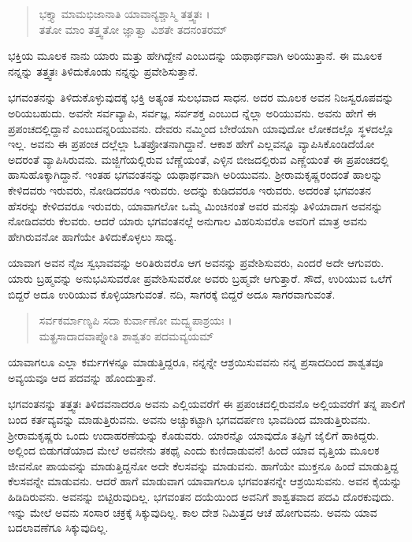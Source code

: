 \begin{verse}
ಭಕ್ತ್ಯಾ ಮಾಮಭಿಜಾನಾತಿ ಯಾವಾನ್ಯಶ್ಚಾಸ್ಮಿ ತತ್ತ್ವತಃ ।\\ತತೋ ಮಾಂ ತತ್ತ್ವತೋ ಜ್ಞಾತ್ವಾ ವಿಶತೇ ತದನಂತರಮ್ 
\end{verse}

{\small ಭಕ್ತಿಯ ಮೂಲಕ ನಾನು ಯಾರು ಮತ್ತು ಹೇಗಿದ್ದೇನೆ ಎಂಬುದನ್ನು ಯಥಾರ್ಥವಾಗಿ ಅರಿಯುತ್ತಾನೆ. ಈ ಮೂಲಕ ನನ್ನನ್ನು ತತ್ತ್ವತಃ ತಿಳಿದುಕೊಂಡು ನನ್ನನ್ನು ಪ್ರವೇಶಿಸುತ್ತಾನೆ.}

ಭಗವಂತನನ್ನು ತಿಳಿದುಕೊಳ್ಳುವುದಕ್ಕೆ ಭಕ್ತಿ ಅತ್ಯಂತ ಸುಲಭವಾದ ಸಾಧನ. ಅದರ ಮೂಲಕ ಅವನ ನಿಜಸ್ವರೂಪವನ್ನು ಅರಿಯಬಹುದು. ಅವನೇ ಸರ್ವವ್ಯಾಪಿ, ಸರ್ವಜ್ಞ, ಸರ್ವಶಕ್ತ ಎಂಬುದ ನ್ನೆಲ್ಲಾ ಅರಿಯುವನು. ಅವನು ಹೇಗೆ ಈ ಪ್ರಪಂಚದಲ್ಲಿದ್ದಾನೆ ಎಂಬುದನ್ನರಿಯುವನು. ದೇವರು ನಮ್ಮಿಂದ ಬೇರೆಯಾಗಿ ಯಾವುದೋ ಲೋಕದಲ್ಲೊ ಸ್ಥಳದಲ್ಲೊ ಇಲ್ಲ. ಅವನು ಈ ಪ್ರಪಂಚ ದಲ್ಲೆಲ್ಲಾ ಓತಪ್ರೋತನಾಗಿದ್ದಾನೆ. ಆಕಾಶ ಹೇಗೆ ಎಲ್ಲವನ್ನೂ ವ್ಯಾಪಿಸಿಕೊಂಡಿದೆಯೋ ಅದರಂತೆ ವ್ಯಾಪಿಸಿರುವನು. ಮಜ್ಜಿಗೆಯಲ್ಲಿರುವ ಬೆಣ್ಣೆಯಂತೆ, ಎಳ್ಳಿನ ಬೀಜದಲ್ಲಿರುವ ಎಣ್ಣೆಯಂತೆ ಈ ಪ್ರಪಂಚದಲ್ಲಿ ಹಾಸುಹೊಕ್ಕಾಗಿದ್ದಾನೆ. ಇಂತಹ ಭಗವಂತನನ್ನು ಯಥಾರ್ಥವಾಗಿ ಅರಿಯುವನು. ಶ್ರೀರಾಮಕೃಷ್ಣರಂದಂತೆ ಹಾಲನ್ನು ಕೇಳಿದವರು ಇರುವರು, ನೋಡಿದವರೂ ಇರುವರು. ಅದನ್ನು ಕುಡಿದವರೂ ಇರುವರು. ಅದರಂತೆ ಭಗವಂತನ ಹೆಸರನ್ನು ಕೇಳಿದವರೂ ಇರುವರು, ಯಾವಾಗಲೋ ಒಮ್ಮೆ ಮಿಂಚಿನಂತೆ ಅವರ ಮನಸ್ಸು ತಿಳಿಯಾದಾಗ ಅವನನ್ನು ನೋಡಿದವರು ಕೆಲವರು. ಆದರೆ ಯಾರು ಭಗವಂತನಲ್ಲೆ ಅನುಗಾಲ ವಿಹರಿಸುವರೊ ಅವರಿಗೆ ಮಾತ್ರ ಅವನು ಹೇಗಿರುವನೋ ಹಾಗೆಯೇ ತಿಳಿದುಕೊಳ್ಳಲು ಸಾಧ್ಯ.

ಯಾವಾಗ ಅವನ ನೈಜ ಸ್ವಭಾವವನ್ನು ಅರಿತಿರುವರೊ ಆಗ ಅವನನ್ನು ಪ್ರವೇಶಿಸುವರು, ಎಂದರೆ ಅದೇ ಆಗುವರು. ಯಾರು ಬ್ರಹ್ಮವನ್ನು ಅನುಭವಿಸುವರೋ ಪ್ರವೇಶಿಸುವರೋ ಅವರು ಬ್ರಹ್ಮವೇ ಆಗುತ್ತಾರೆ. ಸೌದೆ, ಉರಿಯುವ ಒಲೆಗೆ ಬಿದ್ದರೆ ಅದೂ ಉರಿಯುವ ಕೊಳ್ಳಿಯಾಗುವಂತೆ. ನದಿ, ಸಾಗರಕ್ಕೆ ಬಿದ್ದರೆ ಅದೂ ಸಾಗರವಾಗುವಂತೆ.

\begin{verse}
ಸರ್ವಕರ್ಮಾಣ್ಯಪಿ ಸದಾ ಕುರ್ವಾಣೋ ಮದ್ವ್ಯಪಾಶ್ರಯಃ ।\\ಮತ್ಪ್ರಸಾದಾದವಾಪ್ನೋತಿ ಶಾಶ್ವತಂ ಪದಮವ್ಯಯಮ್ 
\end{verse}

{\small ಯಾವಾಗಲೂ ಎಲ್ಲಾ ಕರ್ಮಗಳನ್ನೂ ಮಾಡುತ್ತಿದ್ದರೂ, ನನ್ನನ್ನೇ ಆಶ್ರಯಿಸುವವನು ನನ್ನ ಪ್ರಸಾದದಿಂದ ಶಾಶ್ವತವೂ ಅವ್ಯಯವೂ ಆದ ಪದವನ್ನು ಹೊಂದುತ್ತಾನೆ.}

ಭಗವಂತನನ್ನು ತತ್ತ್ವತಃ ತಿಳಿದವನಾದರೂ ಅವನು ಎಲ್ಲಿಯವರೆಗೆ ಈ ಪ್ರಪಂಚದಲ್ಲಿರುವನೊ ಅಲ್ಲಿಯವರೆಗೆ ತನ್ನ ಪಾಲಿಗೆ ಬಂದ ಕರ್ತವ್ಯವನ್ನು ಮಾಡುತ್ತಿರುವನು. ಅವನು ಅಚ್ಚುಕಟ್ಟಾಗಿ ಭಗವದರ್ಪಣ ಭಾವದಿಂದ ಮಾಡುತ್ತಿರುವನು. ಶ್ರೀರಾಮಕೃಷ್ಣರು ಒಂದು ಉದಾಹರಣೆಯನ್ನು ಕೊಡುವರು. ಯಾರನ್ನೊ ಯಾವುದೊ ತಪ್ಪಿಗೆ ಜೈಲಿಗೆ ಹಾಕಿದ್ದರು. ಅಲ್ಲಿಂದ ಬಿಡುಗಡೆಯಾದ ಮೇಲೆ ಅವನೇನು ತಕಥೈ ಎಂದು ಕುಣಿದಾಡುವನೆ! ಹಿಂದೆ ಯಾವ ವೃತ್ತಿಯ ಮೂಲಕ ಜೀವನೋ ಪಾಯವನ್ನು ಮಾಡುತ್ತಿದ್ದನೋ ಅದೇ ಕೆಲಸವನ್ನು ಮಾಡುವನು. ಹಾಗೆಯೇ ಮುಕ್ತನೂ ಹಿಂದೆ ಮಾಡುತ್ತಿದ್ದ ಕೆಲಸವನ್ನೇ ಮಾಡುವನು. ಆದರೆ ಹಾಗೆ ಮಾಡುವಾಗ ಯಾವಾಗಲೂ ಭಗವಂತನನ್ನೇ ಆಶ್ರಯಿಸುವನು. ಅವನ ಕೈಯನ್ನು ಹಿಡಿದಿರುವನು. ಅವನನ್ನು ಬಿಟ್ಟಿರುವುದಿಲ್ಲ. ಭಗವಂತನ ದಯೆಯಿಂದ ಅವನಿಗೆ ಶಾಶ್ವತವಾದ ಪದವಿ ದೊರಕುವುದು. ಇನ್ನು ಮೇಲೆ ಅವನು ಸಂಸಾರ ಚಕ್ರಕ್ಕೆ ಸಿಕ್ಕುವುದಿಲ್ಲ. ಕಾಲ ದೇಶ ನಿಮಿತ್ತದ ಆಚೆ ಹೋಗುವನು. ಅವನು ಯಾವ ಬದಲಾವಣೆಗೂ ಸಿಕ್ಕುವುದಿಲ್ಲ.

